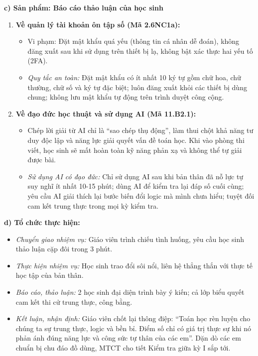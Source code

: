 \documentclass[12pt, a4paper]{article}
\begin{document}
\noindent \textbf{c) Sản phẩm: Báo cáo thảo luận của học sinh}
\begin{enumerate}[leftmargin=0.6cm]
    \item \textbf{Về quản lý tài khoản ôn tập số (Mã 2.6NC1a):}
    \begin{itemize}
        \item Vi phạm: Đặt mật khẩu quá yếu (thông tin cá nhân dễ đoán), không đăng xuất sau khi sử dụng trên thiết bị lạ, không bật xác thực hai yếu tố (2FA).
        \item \textit{Quy tắc an toàn:} Đặt mật khẩu có ít nhất 10 ký tự gồm chữ hoa, chữ thường, chữ số và ký tự đặc biệt; luôn đăng xuất khỏi các thiết bị dùng chung; không lưu mật khẩu tự động trên trình duyệt công cộng.
    \end{itemize}
    \item \textbf{Về đạo đức học thuật và sử dụng AI (Mã 11.B2.1):}
    \begin{itemize}
        \item Chép lời giải từ AI chỉ là ``sao chép thụ động'', làm thui chột khả năng tư duy độc lập và năng lực giải quyết vấn đề toán học. Khi vào phòng thi viết, học sinh sẽ mất hoàn toàn kỹ năng phản xạ và không thể tự giải được bài.
        \item \textit{Sử dụng AI có đạo đức:} Chỉ sử dụng AI sau khi bản thân đã nỗ lực tự suy nghĩ ít nhất 10-15 phút; dùng AI để kiểm tra lại đáp số cuối cùng; yêu cầu AI giải thích lại bước biến đổi logic mà mình chưa hiểu; tuyệt đối cam kết trung thực trong mọi kỳ kiểm tra.
    \end{itemize}
\end{enumerate}

\noindent \textbf{d) Tổ chức thực hiện:}
\begin{itemize}[leftmargin=0.8cm]
    \item \textit{Chuyển giao nhiệm vụ:} Giáo viên trình chiếu tình huống, yêu cầu học sinh thảo luận cặp đôi trong 3 phút.
    \item \textit{Thực hiện nhiệm vụ:} Học sinh trao đổi sôi nổi, liên hệ thẳng thắn với thực tế học tập của bản thân.
    \item \textit{Báo cáo, thảo luận:} 2 học sinh đại diện trình bày ý kiến; cả lớp biểu quyết cam kết thi cử trung thực, công bằng.
    \item \textit{Kết luận, nhận định:} Giáo viên chốt lại thông điệp: ``Toán học rèn luyện cho chúng ta sự trung thực, logic và bền bỉ. Điểm số chỉ có giá trị thực sự khi nó phản ánh đúng năng lực và công sức tự thân của các em''. Dặn dò các em chuẩn bị chu đáo đồ dùng, MTCT cho tiết Kiểm tra giữa kỳ I sắp tới.
\end{itemize}
\end{document}
